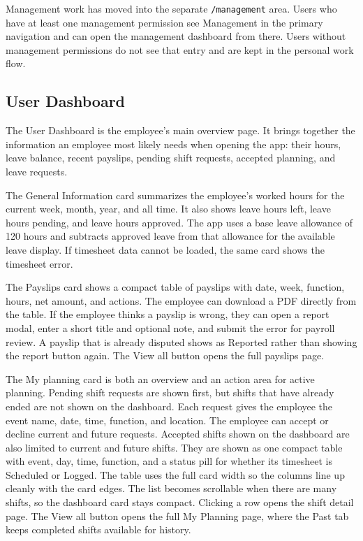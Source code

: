 \documentclass[11pt]{article}
\newcommand{\code}[1]{\nolinkurl{#1}}
\begin{document}
Management work has moved into the separate \code{/management} area. Users who have at least one management permission see Management in the primary navigation and can open the management dashboard from there. Users without management permissions do not see that entry and are kept in the personal work flow.
\subsection{User Dashboard}

The User Dashboard is the employee's main overview page. It brings together the information an employee most likely needs when opening the app: their hours, leave balance, recent payslips, pending shift requests, accepted planning, and leave requests.

The General Information card summarizes the employee's worked hours for the current week, month, year, and all time. It also shows leave hours left, leave hours pending, and leave hours approved. The app uses a base leave allowance of 120 hours and subtracts approved leave from that allowance for the available leave display. If timesheet data cannot be loaded, the same card shows the timesheet error.

The Payslips card shows a compact table of payslips with date, week, function, hours, net amount, and actions. The employee can download a PDF directly from the table. If the employee thinks a payslip is wrong, they can open a report modal, enter a short title and optional note, and submit the error for payroll review. A payslip that is already disputed shows as Reported rather than showing the report button again. The View all button opens the full payslips page.

The My planning card is both an overview and an action area for active planning. Pending shift requests are shown first, but shifts that have already ended are not shown on the dashboard. Each request gives the employee the event name, date, time, function, and location. The employee can accept or decline current and future requests. Accepted shifts shown on the dashboard are also limited to current and future shifts. They are shown as one compact table with event, day, time, function, and a status pill for whether its timesheet is Scheduled or Logged. The table uses the full card width so the columns line up cleanly with the card edges. The list becomes scrollable when there are many shifts, so the dashboard card stays compact. Clicking a row opens the shift detail page. The View all button opens the full My Planning page, where the Past tab keeps completed shifts available for history.
\end{document}
